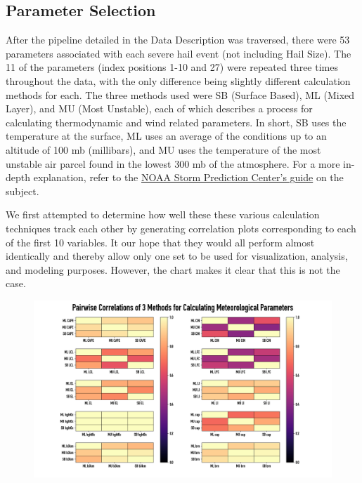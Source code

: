 \documentclass[fleqn,10pt]{SelfArx} %
\begin{document}
\subsection{Parameter Selection}
After the pipeline detailed in the Data Description was traversed, there were 53 parameters associated with each severe hail event (not including Hail Size). The 11 of the parameters (index positions 1-10 and 27) were repeated three times throughout the data, with the only difference being slightly different calculation methods for each. The three methods used were SB (Surface Based), ML (Mixed Layer), and MU (Most Unstable), each of which describes a process for calculating thermodynamic and wind related parameters. In short, SB uses the temperature at the surface, ML uses an average of the conditions up to an altitude of 100 mb (millibars), and MU uses the temperature of the most unstable air parcel found in the lowest 300 mb of the atmosphere. For a more in-depth explanation, refer to the \href{https://www.spc.noaa.gov/exper/mesoanalysis/help/begin.html}{NOAA Storm Prediction Center's guide} on the subject.

We first attempted to determine how well these these various calculation techniques track each other by generating correlation plots corresponding to each of the first 10 variables. It our hope that they would all perform almost identically and thereby allow only one set to be used for visualization, analysis, and modeling purposes. However, the chart makes it clear that this is not the case.

\begin{figure}[H]
\includegraphics[width=1.15\textwidth, right=19cm]{"plots/big_corrplot.png"} 
\end{figure}
\end{document}
